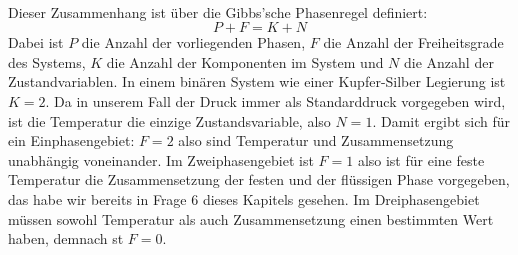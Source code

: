 \documentclass[11pt,a4paper]{article}
\numberwithin{equation}{section}
\numberwithin{figure}{section}
\begin{document}
\\
\begin{addmargin}[25pt]{0pt}
Dieser Zusammenhang ist über die Gibbs'sche Phasenregel definiert:
\begin{equation}\label{eq:Gibbs_Phasenregel}
    P + F = K + N
\end{equation}
Dabei ist $P$ die Anzahl der vorliegenden Phasen, $F$ die Anzahl der Freiheitsgrade des Systems, $K$ die Anzahl der Komponenten im System und $N$ die Anzahl der Zustandvariablen. In einem binären System wie einer Kupfer-Silber Legierung ist $K = 2$. Da in unserem Fall der Druck immer als Standarddruck vorgegeben wird, ist die Temperatur die einzige Zustandsvariable, also $N = 1$. Damit ergibt sich für ein Einphasengebiet: $F = 2$ also sind Temperatur und Zusammensetzung unabhängig voneinander. Im Zweiphasengebiet ist $F = 1$ also ist für eine feste Temperatur die Zusammensetzung der festen und der flüssigen Phase vorgegeben, das habe wir bereits in Frage 6 dieses Kapitels gesehen. Im Dreiphasengebiet müssen sowohl Temperatur als auch Zusammensetzung einen bestimmten Wert haben, demnach st $F = 0$.\\ 
\end{addmargin}
\end{document}
